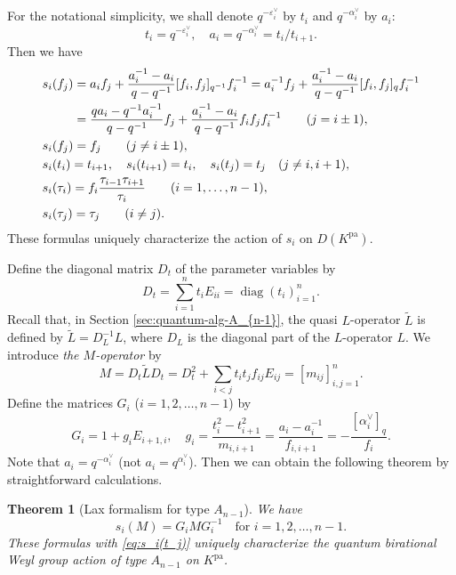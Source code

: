 \documentclass[12pt,twoside]{article}
\newcommand\tL{{\widetilde L}}
\newcommand\av{\alpha^\vee}
\newcommand\eps{\varepsilon}
\newcommand\epsv{\eps^\vee}
\newcommand\pa{{\mathrm{pa}}}
\newcommand\diag{\mathop{\mathrm{diag}}\nolimits}
\theoremstyle{plain} %
\newtheorem{theorem}{Theorem}
\theoremstyle{definition} %
\theoremstyle{definition} %
\numberwithin{theorem}{section}
\numberwithin{equation}{section}
\numberwithin{figure}{section}
\numberwithin{table}{section}
\newcommand\secref[1]{Section \ref{#1}}
\begin{document}
For the notational simplicity, we shall denote $q^{-\epsv_i}$ by $t_i$
and $q^{-\av_i}$ by $a_i$:
\begin{equation*}
 t_i = q^{-\epsv_i}, \quad 
 a_i = q^{-\av_i} = t_i/t_{i+1}.
\end{equation*}
Then we have
\begin{align}
  &
  s_i(f_j)
  = a_i      f_j + \frac{a_i^{-1}-a_i}{q-q^{-1}} [f_i,f_j]_{q^{-1}} f_i^{-1}
  = a_i^{-1} f_j + \frac{a_i^{-1}-a_i}{q-q^{-1}} [f_i,f_j]_q        f_i^{-1}
 \notag
 \\ &
  \hphantom{s_i(f_j)}
  = \frac{q a_i-q^{-1}a_i^{-1}}{q-q^{-1}} f_j 
  + \frac{a_i^{-1}-a_i}{q-q^{-1}} f_i f_j f_i^{-1}
  \qquad (j=i\pm1), 
 \label{eq:s_i(f_j)-1}
 \\ &
  s_i(f_j) = f_j 
  \qquad (j\ne i\pm 1),
 \label{eq:s_i(f_j)-2}
 \\ &
  s_i(t_i) = t_{i+1}, \quad
  s_i(t_{i+1}) = t_i, \quad
  s_i(t_j) = t_j \quad (j\ne i,i+1),
 \label{eq:s_i(t_j)}
 \\ &
  s_i(\tau_i) 
  = f_i\frac{\tau_{i-1}\tau_{i+1}}{\tau_i} 
  \qquad (i=1,\ldots,n-1),
 \notag
 \\ & 
  s_i(\tau_j) = \tau_j
  \qquad (i\ne j).
 \notag 
\end{align}
These formulas uniquely characterize the action of $s_i$ on $D(K^\pa)$.

Define the diagonal matrix $D_t$ of the parameter variables by 
\begin{equation*}
 D_t = \sum_{i=1}^n t_i E_{ii} = \diag(t_i)_{i=1}^n.
\end{equation*}
Recall that, in \secref{sec:quantum-alg-A_{n-1}}, 
the quasi $L$-operator $\tL$ is defined by $\tL=D_L^{-1}L$, 
where $D_L$ is the diagonal part of the $L$-operator $L$.
We introduce {\em the $M$-operator} by
\begin{equation*}
 M = D_t \tL D_t 
   = D_t^2 + \sum_{i<j}t_i t_j f_{ij}E_{ij}
   = [m_{ij}]_{i,j=1}^n.
\end{equation*}
Define the matrices $G_i$ ($i=1,2,\ldots,n-1$) by
\begin{equation*}
 G_i = 1 + g_i E_{i+1,i}, \quad
 g_i = \frac{t_i^2-t_{i+1}^2}{m_{i,i+1}}
     = \frac{a_i-a_i^{-1}}{f_{i,i+1}}
     = -\frac{[\av_i]_q}{f_i}.
\end{equation*}
Note that $a_i=q^{-\av_i}$ (not $a_i=q^{\av_i}$).
Then we can obtain the following theorem by straightforward calculations.

\begin{theorem}[Lax formalism for type $A_{n-1}$]
\label{theorem:Lax-A_{n-1}}
 We have
 \begin{equation*}
   s_i(M)=G_i M G_i^{-1} \quad \text{for $i=1,2,\ldots,n-1$}.
 \end{equation*}
 These formulas with \eqref{eq:s_i(t_j)} uniquely characterize 
 the quantum birational Weyl group action of type $A_{n-1}$ 
 on $K^\pa$.
\end{theorem}
\end{document}
